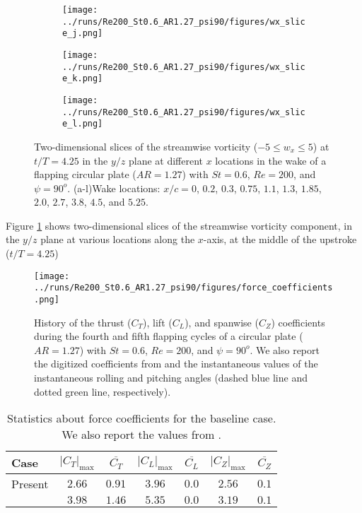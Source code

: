 \begin{figure}
\begin{subfigure}[t]{0.24\textwidth}
    \centering
    \texttt{[image: ../runs/Re200\_St0.6\_AR1.27\_psi90/figures/wx\_slice\_j.png]}
    \caption{}
  \end{subfigure}
  \begin{subfigure}[t]{0.24\textwidth}
    \centering
    \texttt{[image: ../runs/Re200\_St0.6\_AR1.27\_psi90/figures/wx\_slice\_k.png]}
    \caption{}
  \end{subfigure}
  \begin{subfigure}[t]{0.24\textwidth}
    \centering
    \texttt{[image: ../runs/Re200\_St0.6\_AR1.27\_psi90/figures/wx\_slice\_l.png]}
    \caption{}
  \end{subfigure}
  \caption{Two-dimensional slices of the streamwise vorticity ($-5 \leq w_x \leq 5$) at $t / T = 4.25$ in the $y/z$ plane at different $x$ locations in the wake of a flapping circular plate ($AR = 1.27$) with $St = 0.6$, $Re = 200$, and $\psi = 90^o$. (a-l)Wake locations: $x / c = 0$, $0.2$, $0.3$, $0.75$, $1.1$, $1.3$, $1.85$, $2.0$, $2.7$, $3.8$, $4.5$, and $5.25$.}
  \label{fig:baseline_wx_slices}
\end{figure}

Figure \ref{fig:baseline_wx_slices} shows two-dimensional slices of the streamwise vorticity component, in the $y/z$ plane at various locations along the $x$-axis, at the middle of the upstroke ($t/T = 4.25$)

\begin{figure}
  \centering
  \texttt{[image: ../runs/Re200\_St0.6\_AR1.27\_psi90/figures/force\_coefficients.png]}
  \caption{History of the thrust ($C_T$), lift ($C_L$), and spanwise ($C_Z$) coefficients during the fourth and fifth flapping cycles of a circular plate ($AR = 1.27$) with $St = 0.6$, $Re = 200$, and $\psi = 90^o$. We also report the digitized coefficients from \cite{li_dong_2016} and the instantaneous values of the instantaneous rolling and pitching angles (dashed blue line and dotted green line, respectively).}
  \label{fig:baseline_force_coefficients}
\end{figure}

\begin{table}
  \centering
  \begin{tabular}{lcccccc}
    \hline\hline
    Case & $\left| C_T \right|_\text{max}$ & $\overline{C_T}$ & $\left| C_L \right|_\text{max}$ & $\overline{C_L}$ & $\left| C_Z \right|_\text{max}$ & $\overline{C_Z}$ \\
    \hline
    Present & $2.66$ & $0.91$ & $3.96$ & $0.0$ & $2.56$ & $0.1$ \\
    \citet{li_dong_2016} & $3.98$ & $1.46$ & $5.35$ & $0.0$ & $3.19$ & $0.1$ \\
    \hline\hline
  \end{tabular}
  \caption{Statistics about force coefficients for the baseline case. We also report the values from \citet{li_dong_2016}.}
  \label{tab:baseline_force_coefficients}
\end{table}

